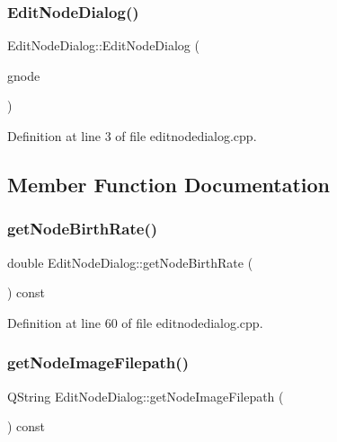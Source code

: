 \subsubsection{\texorpdfstring{Edit\+Node\+Dialog()}{EditNodeDialog()}}
{\footnotesize\ttfamily Edit\+Node\+Dialog\+::\+Edit\+Node\+Dialog (\begin{DoxyParamCaption}\item[{\mbox{\hyperlink{struct_g_node}{G\+Node}} $\ast$}]{gnode }\end{DoxyParamCaption})}



Definition at line 3 of file editnodedialog.\+cpp.



\subsection{Member Function Documentation}
\mbox{\label{class_edit_node_dialog_ab314148e6b30966638e2be8352098ecd}} 
\subsubsection{\texorpdfstring{get\+Node\+Birth\+Rate()}{getNodeBirthRate()}}
{\footnotesize\ttfamily double Edit\+Node\+Dialog\+::get\+Node\+Birth\+Rate (\begin{DoxyParamCaption}{ }\end{DoxyParamCaption}) const}



Definition at line 60 of file editnodedialog.\+cpp.

\mbox{\label{class_edit_node_dialog_a332d0500932bcb07e9e2b6bb563f2caf}} 
\subsubsection{\texorpdfstring{get\+Node\+Image\+Filepath()}{getNodeImageFilepath()}}
{\footnotesize\ttfamily Q\+String Edit\+Node\+Dialog\+::get\+Node\+Image\+Filepath (\begin{DoxyParamCaption}{ }\end{DoxyParamCaption}) const}



